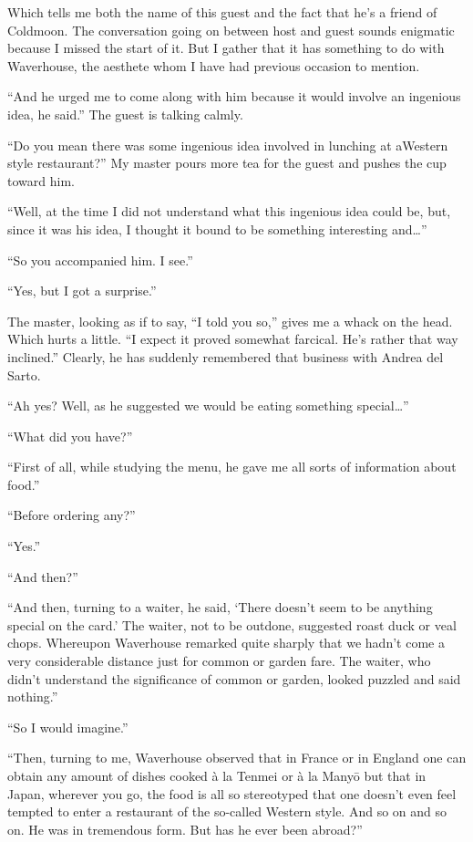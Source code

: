 \documentclass{book}
\begin{document}
Which tells me both the name of this guest and the fact that he's a
friend of Coldmoon. The conversation going on between host and guest
sounds enigmatic because I missed the start of it. But I gather that it
has something to do with Waverhouse, the aesthete whom I have had
previous occasion to mention.

``And he urged me to come along with him because it would involve an
ingenious idea, he said.'' The guest is talking calmly.

``Do you mean there was some ingenious idea involved in lunching at
aWestern style restaurant?'' My master pours more tea for the guest and
pushes the cup toward him.

``Well, at the time I did not understand what this ingenious idea could
be, but, since it was his idea, I thought it bound to be something
interesting and\ldots{}''

``So you accompanied him. I see.''

``Yes, but I got a surprise.''

The master, looking as if to say, ``I told you so,'' gives me a whack on
the head. Which hurts a little. ``I expect it proved somewhat farcical.
He's rather that way inclined.'' Clearly, he has suddenly remembered
that business with Andrea del Sarto.

``Ah yes? Well, as he suggested we would be eating something
special\ldots{}''

``What did you have?''

``First of all, while studying the menu, he gave me all sorts of
information about food.''

``Before ordering any?''

``Yes.''

``And then?''

``And then, turning to a waiter, he said, `There doesn't seem to be
anything special on the card.' The waiter, not to be outdone, suggested
roast duck or veal chops. Whereupon Waverhouse remarked quite sharply
that we hadn't come a very considerable distance just for common or
garden fare. The waiter, who didn't understand the significance of
common or garden, looked puzzled and said nothing.''

``So I would imagine.''

``Then, turning to me, Waverhouse observed that in France or in England
one can obtain any amount of dishes cooked à la Tenmei or à la Manyō but
that in Japan, wherever you go, the food is all so stereotyped that one
doesn't even feel tempted to enter a restaurant of the so-called Western
style. And so on and so on. He was in tremendous form. But has he ever
been abroad?''
\end{document}
